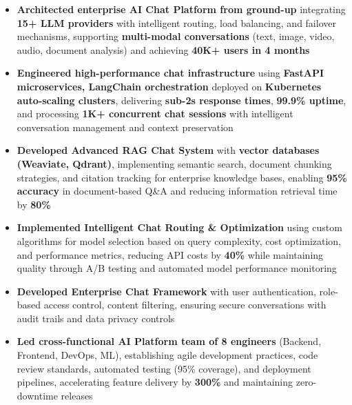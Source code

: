 \documentclass[10pt,a4paper,ragged2e,withhyper]{altacv}
\begin{document}
\begin{itemize}
    \item \textbf{Architected enterprise AI Chat Platform from ground-up} integrating \textbf{15+ LLM providers} with intelligent routing, load balancing, and failover mechanisms, supporting \textbf{multi-modal conversations} (text, image, video, audio, document analysis) and achieving \textbf{40K+ users in 4 months}
    
    \item \textbf{Engineered high-performance chat infrastructure} using \textbf{FastAPI microservices, LangChain orchestration} deployed on \textbf{Kubernetes auto-scaling clusters}, delivering \textbf{sub-2s response times}, \textbf{99.9\% uptime}, and processing \textbf{1K+ concurrent chat sessions} with intelligent conversation management and context preservation
    
    \item \textbf{Developed Advanced RAG Chat System} with \textbf{vector databases (Weaviate, Qdrant)}, implementing semantic search, document chunking strategies, and citation tracking for enterprise knowledge bases, enabling \textbf{95\% accuracy} in document-based Q\&A and reducing information retrieval time by \textbf{80\%}
    
    \item \textbf{Implemented Intelligent Chat Routing \& Optimization} using custom algorithms for model selection based on query complexity, cost optimization, and performance metrics, reducing API costs by \textbf{40\%} while maintaining quality through A/B testing and automated model performance monitoring
    
    \item \textbf{Developed Enterprise Chat Framework} with user authentication, role-based access control, content filtering, ensuring secure conversations with audit trails and data privacy controls
    
    \item \textbf{Led cross-functional AI Platform team of 8 engineers} (Backend, Frontend, DevOps, ML), establishing agile development practices, code review standards, automated testing (95\% coverage), and deployment pipelines, accelerating feature delivery by \textbf{300\%} and maintaining zero-downtime releases
\end{itemize}

\divider

\end{document}

